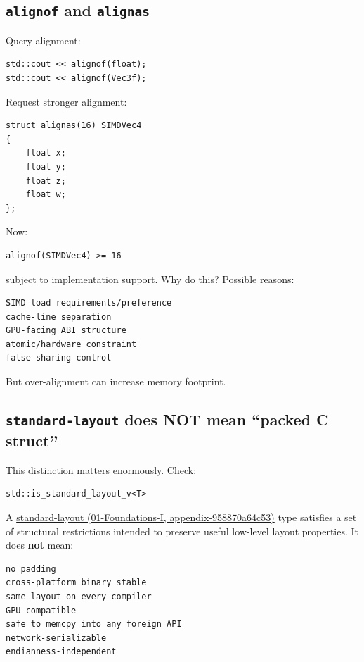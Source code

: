 \subsection{\texorpdfstring{\texttt{alignof} and \texttt{alignas}}{alignof and alignas}}\label{05-engine-i-ch003-alignof-and-alignas}

Query alignment:

\begin{verbatim}
std::cout << alignof(float);
std::cout << alignof(Vec3f);
\end{verbatim}

Request stronger alignment:

\begin{verbatim}
struct alignas(16) SIMDVec4
{
    float x;
    float y;
    float z;
    float w;
};
\end{verbatim}

Now:

\begin{verbatim}
alignof(SIMDVec4) >= 16
\end{verbatim}

subject to implementation support. Why do this? Possible reasons:

\begin{verbatim}
SIMD load requirements/preference
cache-line separation
GPU-facing ABI structure
atomic/hardware constraint
false-sharing control
\end{verbatim}

But over-alignment can increase memory footprint.

\subsection{\texorpdfstring{\texttt{standard-layout} does NOT mean ``packed C struct''}{standard-layout does NOT mean ``packed C struct''}}\label{05-engine-i-ch003-standard-layout-does-not-mean-packed-c-struct}

This distinction matters enormously. Check:

\begin{verbatim}
std::is_standard_layout_v<T>
\end{verbatim}

A \href{../01-Foundations-I/main.pdf\#nameddest=appendix-958870a64c53}{standard-layout (01-Foundations-I, appendix-958870a64c53)} type satisfies a set of structural restrictions intended to preserve useful low-level layout properties. It does \textbf{not} mean:

\begin{verbatim}
no padding
cross-platform binary stable
same layout on every compiler
GPU-compatible
safe to memcpy into any foreign API
network-serializable
endianness-independent
\end{verbatim}

